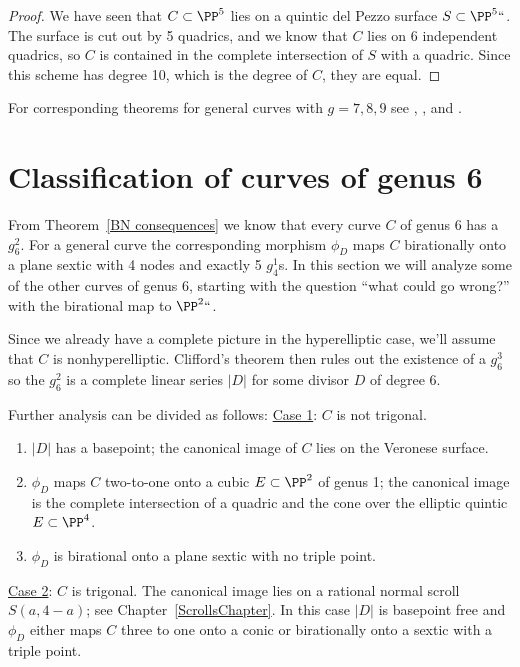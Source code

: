 \begin{proof}
We have seen that $C \subset \PP^5$ lies on a quintic del Pezzo surface
%
$S \subset \PP^5` `$. The surface is cut out by 5 quadrics, and we know
that $C$ lies on 6 independent quadrics,
so $C$ is contained in the complete intersection of $S$ with a
quadric. Since this scheme has degree 10, which is the degree of $C$,
they are equal.
\end{proof}

For corresponding theorems for general curves with $g=7,8,9$ see
\cite{Mukai1}, \cite{Mukai2}, and \cite{Mukai3}.


\section{Classification of curves of genus 6}

From Theorem~\ref{BN consequences} we know that every curve $C$ of genus
6 has  a $g^{2}_{6}$. For a general curve the corresponding morphism
$\phi_{D}$ maps $C$ birationally onto a plane sextic with 4 nodes and
exactly 5 $g^{1}_{4}$s.
In this  section we will analyze some of the other curves of genus 6,
starting with the question  ``what could go wrong?''
with the birational map to $\PP^2` `$.

Since we already have a complete picture in the hyperelliptic case, we'll
assume that $C$ is nonhyperelliptic. Clifford's theorem then rules out
the existence of a $g^3_6$ so  the $g^2_6$ is a complete linear series
$|D|$ for some divisor $D$ of degree 6.

Further analysis can be divided as follows:
\smallbreak
\noindent\underline{Case 1}:
$C$ is not
trigonal.
%
\begin{enumerate}\def\theenumi{\alph{enumi}}
 \item $|D|$ has a basepoint; the canonical image of $C$ lies on the
 Veronese surface.
\item $\phi_{D}$ maps $C$
two-to-one
%
onto a cubic $E \subset \PP^2$ of
genus 1; the canonical image is the
complete intersection
%
of a quadric
and the
cone over the elliptic quintic
%
%
$E\subset \PP^{4}$.
\item $\phi_{D}$ is birational onto a plane sextic with no triple point.
 \end{enumerate}
\noindent\underline{Case 2}:
$C$ is trigonal. The canonical image lies on a
rational normal scroll $S(a,4-a)$; see Chapter~\ref{ScrollsChapter}.
In this case $|D|$ is basepoint free and $\phi_{D}$  either maps $C$
three to one onto a conic
 or birationally onto a
sextic with a triple point.
%
%
%
\smallbreak

